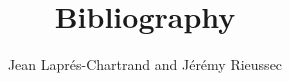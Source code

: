 \documentclass[12pt,a4paper]{article}
\author{Jean Laprés-Chartrand and Jérémy Rieussec}
\title{Bibliography}
\begin{document}
	\maketitle 
	
	\nocite{*}	
	
	
\end{document}
